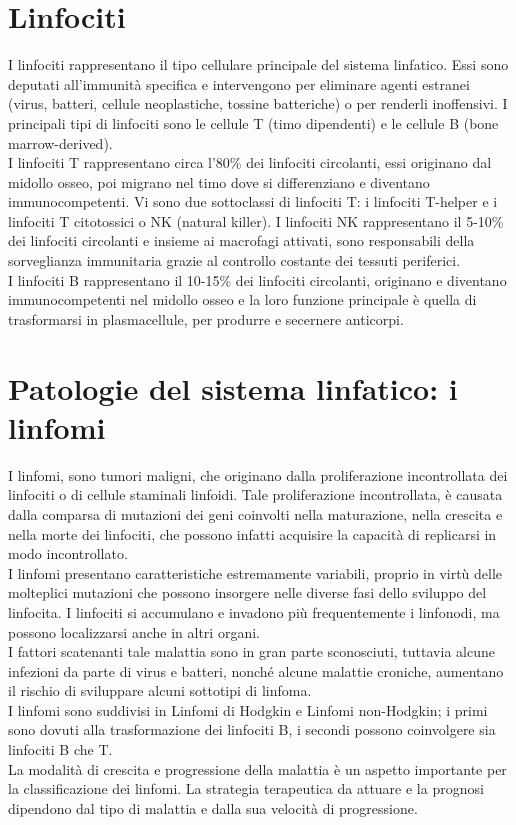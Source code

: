 \section{Linfociti}
I linfociti rappresentano il tipo cellulare principale del sistema linfatico. 
Essi sono deputati all'immunità specifica e intervengono per eliminare agenti estranei 
(virus, batteri, cellule neoplastiche, tossine batteriche) o per renderli inoffensivi. 
I principali tipi di linfociti sono le cellule T (timo dipendenti) e le cellule B (bone marrow-derived)\cite{BOOK2}.\\
I linfociti T rappresentano circa l’80\% dei linfociti circolanti, essi originano dal midollo osseo, 
poi migrano nel timo dove si differenziano e diventano immunocompetenti. 
Vi sono due sottoclassi di linfociti T: i linfociti T-helper e i linfociti T citotossici o NK (natural killer). 
I linfociti NK rappresentano il 5-10\% dei linfociti circolanti e insieme ai macrofagi attivati, 
sono responsabili della sorveglianza immunitaria grazie al controllo costante dei tessuti periferici.\\
I linfociti B rappresentano il 10-15\% dei linfociti circolanti, originano e diventano immunocompetenti 
nel midollo osseo e la loro funzione principale è quella di trasformarsi in plasmacellule, 
per produrre e secernere anticorpi\cite{BOOK2}.\\   

\section{Patologie del sistema linfatico: i linfomi}
I linfomi, sono tumori maligni, che originano dalla proliferazione incontrollata dei linfociti o di cellule staminali 
linfoidi. Tale proliferazione incontrollata, è causata dalla comparsa di mutazioni dei geni coinvolti 
nella maturazione, nella crescita e nella morte dei linfociti, 
che possono infatti acquisire la capacità di replicarsi in modo incontrollato\cite{LINFOMIAIL}.\\ 
I linfomi presentano caratteristiche estremamente variabili, proprio in virtù delle molteplici mutazioni 
che possono insorgere nelle diverse fasi dello sviluppo del linfocita. 
I linfociti si accumulano e invadono più frequentemente i linfonodi, ma possono localizzarsi anche in altri organi.\\
I fattori scatenanti tale malattia sono in gran parte sconosciuti, tuttavia alcune infezioni da parte di virus e 
batteri, nonché alcune malattie croniche, aumentano il rischio di sviluppare alcuni sottotipi di linfoma\cite{LINFOMIAIL}.\\

I linfomi sono suddivisi in Linfomi di Hodgkin e Linfomi non-Hodgkin; 
i primi sono dovuti alla trasformazione dei linfociti B, i secondi possono coinvolgere sia linfociti B che T.\\ 
La modalità di crescita e progressione della malattia è un aspetto importante per la classificazione dei linfomi.
La strategia terapeutica da attuare e la prognosi dipendono dal tipo di malattia e dalla sua velocità di 
progressione\cite{LINFOMIAIL}.\\





